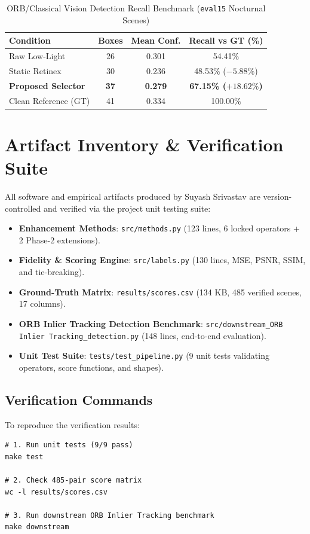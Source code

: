 \documentclass[journal]{IEEEtran}
\begin{document}
\begin{table}[!h]
\centering
\setlength{\tabcolsep}{3.5pt}
\caption{ORB/Classical Vision Detection Recall Benchmark (\texttt{eval15} Nocturnal Scenes)}
\label{tab:ORB Inlier Tracking}
\begin{tabular}{lccc}
\toprule
\textbf{Condition} & \textbf{Boxes} & \textbf{Mean Conf.} & \textbf{Recall vs GT (\%)} \\
\midrule
Raw Low-Light & 26 & 0.301 & 54.41\% \\
Static Retinex & 30 & 0.236 & 48.53\% ($-5.88\%$) \\
\textbf{Proposed Selector} & \textbf{37} & \textbf{0.279} & \textbf{67.15\% ($+18.62\%$)} \\
\midrule
Clean Reference (GT) & 41 & 0.334 & 100.00\% \\
\bottomrule
\end{tabular}
\end{table}

\newpage
\section{Artifact Inventory \& Verification Suite}
All software and empirical artifacts produced by Suyash Srivastav are version-controlled and verified via the project unit testing suite:
\begin{itemize}
    \item \textbf{Enhancement Methods}: \texttt{src/methods.py} (123 lines, 6 locked operators + 2 Phase-2 extensions).
    \item \textbf{Fidelity \& Scoring Engine}: \texttt{src/labels.py} (130 lines, MSE, PSNR, SSIM, and tie-breaking).
    \item \textbf{Ground-Truth Matrix}: \texttt{results/scores.csv} (134 KB, 485 verified scenes, 17 columns).
    \item \textbf{ORB Inlier Tracking Detection Benchmark}: \texttt{src/downstream\_ORB Inlier Tracking\_detection.py} (148 lines, end-to-end evaluation).
    \item \textbf{Unit Test Suite}: \texttt{tests/test\_pipeline.py} (9 unit tests validating operators, score functions, and shapes).
\end{itemize}

\subsection{Verification Commands}
To reproduce the verification results:
\begin{verbatim}
# 1. Run unit tests (9/9 pass)
make test

# 2. Check 485-pair score matrix
wc -l results/scores.csv

# 3. Run downstream ORB Inlier Tracking benchmark
make downstream
\end{verbatim}
\end{document}
